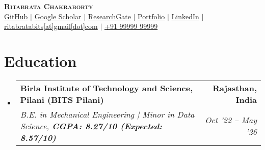\documentclass[letterpaper,11pt]{article}
\makeatletter
\newcommand{\resumeSubheading}[4]{
  \vspace{0pt}\item
  \begin{tabular*}{0.97\textwidth}[t]{l@{\extracolsep{\fill}}r}
    \textbf{#1} & \textbf{#2} \\
    \textit{\small #3} & \textit{\small #4} \\
  \end{tabular*}\vspace{-6pt}
}
\newcommand{\resumeSubHeadingListStart}{
  \begin{itemize}[leftmargin=0.10in, label={}]\vspace{6pt}
}
\newcommand{\resumeSubHeadingListEnd}{
  \end{itemize}
}
\makeatother
\begin{document}

\begin{center}
  \textbf{\Huge \scshape Ritabrata Chakraborty} \\ \vspace{5pt}
  \small
  {\color{blue}\href{https://github.com/Ritabrata-Chakraborty}{GitHub} $|$ 
  \href{https://scholar.google.com/citations?user=JikCewwAAAAJ&hl=en}{Google Scholar} $|$
  \href{https://www.researchgate.net/profile/Ritabrata-Chakraborty-3/research}{ResearchGate} $|$
  \href{https://ritabrata-chakraborty.github.io/Portfolio/}{Portfolio} $|$
  \href{https://www.linkedin.com/in/ritabrata-chakraborty-a63268251/}{LinkedIn} $|$
  \href{mailto:ritabratabits[at]gmail[dot]com}{ritabratabits[at]gmail[dot]com} $|$ \href{tel:+919999999999}{+91 99999 99999}}
\end{center}



\section{Education}
\resumeSubHeadingListStart
  \resumeSubheading
    {Birla Institute of Technology and Science, Pilani (BITS Pilani)}{Rajasthan, India}
    {B.E. in Mechanical Engineering | Minor in Data Science, \textbf{CGPA: 8.27/10 (Expected: 8.57/10)}}{Oct '22 – May '26}
\resumeSubHeadingListEnd

\end{document}
